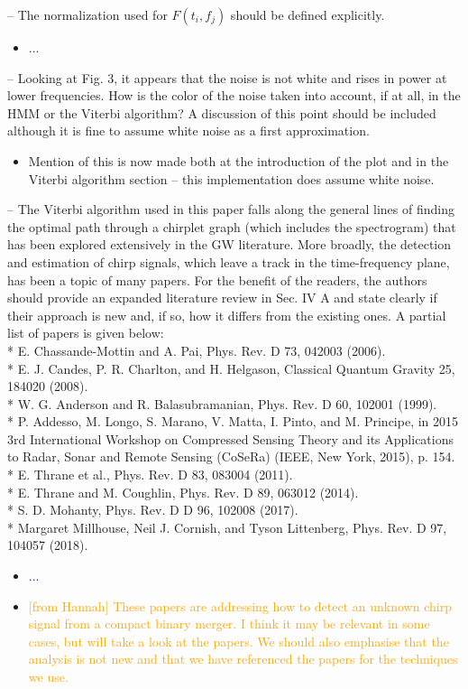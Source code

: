 \documentclass{article}
\newcommand{\todo}{\textcolor{blue}}
\newcommand{\han}{\textcolor{orange}}
\begin{document}
\noindent
-- The normalization used for $F(t_i, f_j)$ should be defined explicitly. 
\begin{itemize}
\item \todo{...}
\end{itemize}

\noindent
-- Looking at Fig. 3, it appears that the noise is not white and rises in power at lower frequencies. How is the color of the noise taken into account, if at all, in the HMM or the Viterbi algorithm? A discussion of this point should be included although it is fine to assume white noise as a first approximation. 
\begin{itemize}
\item Mention of this is now made both at the introduction of the plot and in the Viterbi algorithm section -- this implementation does assume white noise.
\end{itemize}

\noindent
-- The Viterbi algorithm used in this paper falls along the general lines of finding the optimal path through a chirplet graph (which includes the spectrogram) that has been explored extensively in the GW literature. More broadly, the detection and estimation of chirp signals, which leave a track in the time-frequency plane, has been a topic of many papers. For the benefit of the readers, the authors should provide an expanded literature review in Sec. IV A and state clearly if their approach is new and, if so, how it differs from the existing ones. A partial list of papers is given below: \\    
* E. Chassande-Mottin and A. Pai, Phys. Rev. D 73, 042003 (2006). \\
* E. J. Candes, P. R. Charlton, and H. Helgason, Classical Quantum Gravity 25, 184020 (2008).   \\
* W. G. Anderson and R. Balasubramanian, Phys. Rev. D 60, 102001 (1999).   \\
* P. Addesso, M. Longo, S. Marano, V. Matta, I. Pinto, and M. Principe, in 2015 3rd International Workshop on  Compressed Sensing Theory and its Applications to Radar, Sonar and Remote Sensing (CoSeRa) (IEEE, New York, 2015), p. 154.   \\
* E. Thrane et al., Phys. Rev. D 83, 083004 (2011).   \\
* E. Thrane and M. Coughlin, Phys. Rev. D 89, 063012 (2014).    \\
* S. D. Mohanty, Phys. Rev. D  D 96, 102008 (2017).   \\
* Margaret Millhouse, Neil J. Cornish, and Tyson Littenberg, Phys. Rev. D 97, 104057 (2018).\\
\begin{itemize}
\item \todo{...}
\item \han{[from Hannah] These papers are addressing how to detect an unknown chirp signal from a compact binary merger. I think it may be relevant in some cases, but will take a look at the papers. We should also emphasise that the analysis is not new and that we have referenced the papers for the techniques we use. }
\end{itemize}
\end{document}
